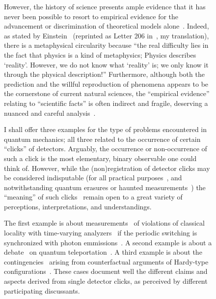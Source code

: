 \documentclass[entropy,article,accept,oneauthor,pdftex]{Definitions/mdpi}
\begin{document}
\begin{figure}[H]
However, the history of science presents ample evidence that it has never been possible to resort to empirical evidence
for the advancement or discrimination of theoretical models alone~\cite{kuhn,lakatosch,lakatos_1978}.
Indeed, as stated by Einstein~\cite{einstei-letter-to-schr} (reprinted as Letter 206 in~\cite{Meyenn-2011}, my translation),
there is a metaphysical circularity because
``the real difficulty lies in the fact that physics is a kind of metaphysics;
Physics describes `reality'. However, we do not know what `reality' is;
we only know it through the physical description!''
Furthermore, although both the prediction and the willful reproduction of phenomena
appears to be the cornerstone of current natural sciences,
the ``empirical evidence'' relating to ``scientific facts'' is often indirect and fragile,
deserving a nuanced and careful analysis~\cite{Hume-Treatise,Hume-Enquiry}.

I shall offer three examples for the type of problems encountered in quantum mechanics;
all three related to the occurrence of certain ``clicks'' of detectors.
Arguably, the occurrence or non-occurrence of such a click is the most elementary, binary observable one could think of.
However, while the (non)registration of detector clicks may be considered indisputable
(for all practical purposes~\cite{bell-a}, and notwithstanding quantum erasures or haunted measurements~\cite{PhysRevD.22.879,PhysRevA.25.2208,greenberger2,Nature351,Zajonc-91,PhysRevA.45.7729,PhysRevLett.73.1223,PhysRevLett.75.3783,hkwz})
the ``meaning'' of such clicks~\cite{svozil-2017-b} remain open to a great variety of perceptions, interpretations, and understandings.

The first example is about measurements~\cite{aspect-81} of violations of classical locality with time-varying analyzers~\cite{aspect-82b}
if the periodic switching is synchronized with photon emmissions~\cite{zeilinger-86}.
A second example is about a debate~\cite{Kimble-aposterioriQT,Bouwm-aposterioriQTReply} on quantum teleportation~\cite{Bouwmeester1997,BBCJPW}.
A third example is about the contingencies~\cite{svozil-2020-c}
arising from counterfactual arguments of Hardy-type configurations~\cite{2018-minimalYIYS,svozil-2020-hardy}.
These cases document well the different claims and aspects derived from single detector clicks, as perceived by different participating discussants.




\end{figure}
\end{document}
